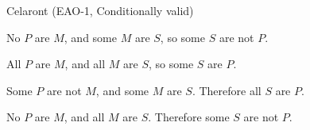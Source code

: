 \begin{exercises}
{Celaront (EAO-1, Conditionally valid) 
\vspace{6pt} }

\item No $P$ are $M$, and some $M$ are $S$, so some $S$ are not $P$.  
 
\item All $P$ are $M$, and all $M$ are $S$, so some $S$ are $P$.

\item Some $P$ are not $M$, and some $M$ are $S$. Therefore all $S$ are $P$.

\item No $P$ are $M$, and all $M$ are $S$. Therefore some $S$ are not $P$. 


\end{exercises}
